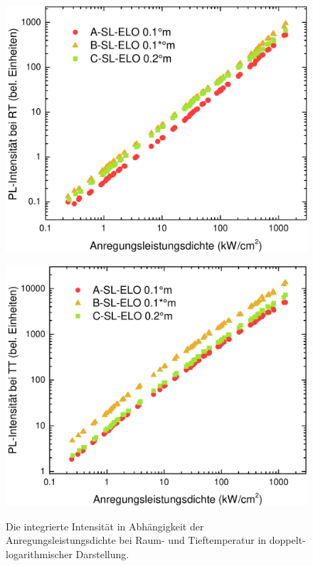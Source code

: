 \begin{figure}[H]
  \centering
  \begin{minipage}[t]{0.49\textwidth}
    \centering
    \includegraphics[width=\textwidth]{Bilder/TS4048/intRT.pdf}
		\caption{}
    \label{fig:eloINTrt}
  \end{minipage}
	\hfill
  \begin{minipage}[t]{0.49\textwidth}
    \centering
    \includegraphics[width=\linewidth]{Bilder/TS4048/intTT.pdf}
    \label{fig:sleloINTtt}
		\caption{}
  \end{minipage}
	\caption{Die integrierte Intensität in Abhängigkeit der Anregungsleistungsdichte bei Raum- und Tieftemperatur in doppelt-logarithmischer Darstellung. }
	\label{fig:intttrtsl}
\end{figure}

